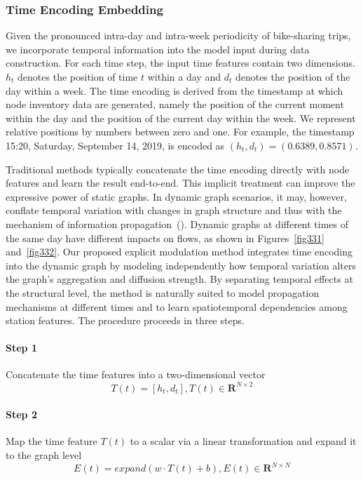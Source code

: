 \documentclass[preprint,12pt,authoryear]{elsarticle}
\begin{document}
\subsubsection{Time Encoding Embedding}
Given the pronounced intra-day and intra-week periodicity of bike-sharing trips, we incorporate temporal information into the model input during data construction. For each time step, the input time features contain two dimensions. $h_t$ denotes the position of time $t$ within a day and $d_t$ denotes the position of the day within a week. The time encoding is derived from the timestamp at which node inventory data are generated, namely the position of the current moment within the day and the position of the current day within the week. We represent relative positions by numbers between zero and one. For example, the timestamp 15:20, Saturday, September 14, 2019, is encoded as $(h_t,d_t)=(0.6389,0.8571)$.

Traditional methods typically concatenate the time encoding directly with node features and learn the result end-to-end. This implicit treatment can improve the expressive power of static graphs. In dynamic graph scenarios, it may, however, conflate temporal variation with changes in graph structure and thus with the mechanism of information propagation~(\cite{jin2022neural}). Dynamic graphs at different times of the same day have different impacts on flows, as shown in Figures~\ref{fig331} and~\ref{fig332}. Our proposed explicit modulation method integrates time encoding into the dynamic graph by modeling independently how temporal variation alters the graph's aggregation and diffusion strength. By separating temporal effects at the structural level, the method is naturally suited to model propagation mechanisms at different times and to learn spatiotemporal dependencies among station features. The procedure proceeds in three steps.

\paragraph{Step 1} Concatenate the time features into a two-dimensional vector
\begin{equation}
T(t)=[h_t,d_t], T(t)\in\mathbf{R}^{N\times 2}
\end{equation}
\paragraph{Step 2} Map the time feature $T(t)$ to a scalar via a linear transformation and expand it to the graph level
\begin{equation}
E(t)=expand(w\cdot T(t)+b), E(t)\in\mathbf{R}^{N\times N}
\end{equation}
\end{document}
